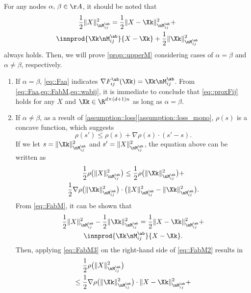 For any nodes $\alpha,\,\beta\in\AA$, it should be noted that
\begin{multline}\label{eq::FabM}
	\frac{1}{2}\|X\|_{\nM_{ij}^{\ab}}^2 = \frac{1}{2}\|X-\Xk\|_{\nM_{ij}^{\ab}}^2+\\
	\innprod{\Xk\nM_{ij}^{\ab}}{X-\Xk} + \frac{1}{2}\|\Xk\|_{\nM_{ij}^{\ab}}^2
\end{multline}
always holds. Then, we will prove \cref{prop::upperM} considering cases of $\alpha=\beta$ and $\alpha\neq\beta$, respectively. 

\begin{enumerate}[leftmargin=0.45cm]
\item If $\alpha=\beta$, \cref{eq::Faa} indicates $\nabla F_{ij}^{\ab}(\Xk)=\Xk\nM_{ij}^{\ab}$. From \cref{eq::Faa,eq::FabM,eq::wabij}, it is immediate to conclude that \cref{eq::proxFij} holds for any $X$ and $\Xk\in \R^{d\times(d+1)n}$ as long as $\alpha=\beta$.
\vspace{0.25em}
\item If $\alpha\neq\beta$, as a result of \cref{assumption::loss}\ref{assumption::loss_mono},  $\rho(s)$ is a concave function, which suggests
\begin{equation}
	\nonumber
	\rho(s')\leq \rho(s)+\nabla\rho(s)\cdot(s'-s).
\end{equation}
If we let $s=\|\Xk\|_{\nM_{ij}^{\ab}}^2$ and $s'=\|X\|_{\nM_{ij}^{\ab}}^2$, the equation above can be written as
\begin{multline}\label{eq::FabM2}
	\frac{1}{2}\rho\big(\|X\|_{\nM_{ij}^{\ab}}^2\big)\leq \frac{1}{2}\rho\big(\|\Xk\|_{\nM_{ij}^{\ab}}^2\big)+\\
	\frac{1}{2}\nabla\rho\big(\|\Xk\|_{\nM_{ij}^{\ab}}^2\big)\cdot\big(\|X\|_{\nM_{ij}^{\ab}}^2-\|\Xk\|_{\nM_{ij}^{\ab}}^2\big).
\end{multline}
From \cref{eq::FabM}, it can be shown that
\begin{multline}\label{eq::FabM3}
	\frac{1}{2}\|X\|_{\nM_{ij}^{\ab}}^2-\frac{1}{2}\|\Xk\|_{\nM_{ij}^{\ab}}^2 = \frac{1}{2}\|X-\Xk\|_{\nM_{ij}^{\ab}}^2+\\
	\innprod{\Xk\nM_{ij}^{\ab}}{X-\Xk}.
\end{multline}
Then, applying \cref{eq::FabM3} on the right-hand side of \cref{eq::FabM2} results in
\begin{equation}\label{eq::FabM4}
\begin{aligned}
&\frac{1}{2}\rho\big(\|X\|_{\nM_{ij}^{\ab}}^2\big)\\
\leq\; & \frac{1}{2}\nabla\rho\big(\|\Xk\|_{\nM_{ij}^{\ab}}^2\big)\cdot\|X-\Xk\|_{\nM_{ij}^{\ab}}^2+\\

\end{aligned}
\end{equation}
\end{enumerate}
